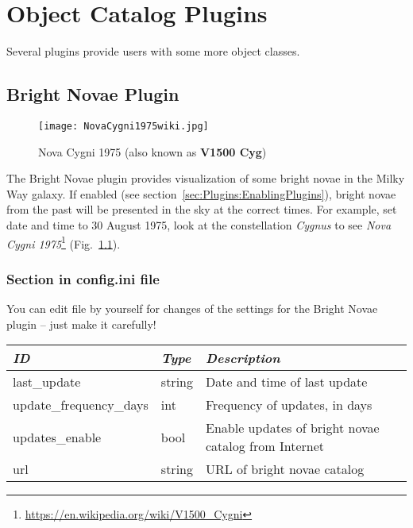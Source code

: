 
\chapter{Object Catalog Plugins}
Several plugins provide users with some more object classes. 


\section{Bright Novae Plugin}
\label{sec:plugins:BrightNovae}

\begin{figure}[ht]
\texttt{[image: NovaCygni1975wiki.jpg]}
\caption{Nova Cygni 1975 (also known as \textbf{V1500 Cyg})}
\label{fig:NovaCygni1975}
\end{figure}


\noindent The Bright Novae plugin provides visualization of some
bright novae in the Milky Way galaxy.
If enabled (see section~\ref{sec:Plugins:EnablingPlugins}), bright
novae from the past will be presented in the sky at the correct
times. For example, set date and time to 30 August 1975, look at the constellation \emph{Cygnus} to see
\emph{Nova Cygni 1975}\footnote{\url{https://en.wikipedia.org/wiki/V1500_Cygni}} (Fig.~\ref{fig:NovaCygni1975}).


\subsection{Section  in config.ini file}

You can edit  file by yourself for changes of the
settings for the Bright Novae plugin -- just make it carefully!

\noindent%
\begin{tabularx}{\textwidth}{l|l|X}\toprule
\emph{ID}            & \emph{Type} & \emph{Description}\\\midrule
last\_update            & string & Date and time of last update\\%
update\_frequency\_days & int    & Frequency of updates, in days\\%
updates\_enable         & bool   & Enable updates of bright novae catalog from Internet \\%
url                     & string & URL of bright novae catalog \\\bottomrule
\end{tabularx}

